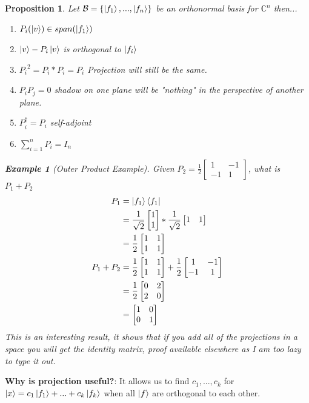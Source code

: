 \documentclass[12pt]{article}
\theoremstyle{plain}
\newtheorem{proposition}[lemma]{Proposition}
\theoremstyle{nonumberplain}
\theoremstyle{plain}
\newtheorem{example}[lemma]{Example}
\theoremstyle{nonumberplain}
\newcommand\1{{\bf 1}}
\newcommand{\bmat}[1]{\begin{bmatrix*} #1 \end{bmatrix*}} %
\newcommand{\C}{\mathbb{C}} %
\newcommand{\<}{\left\langle}
\renewcommand{\>}{\right\rangle}
\begin{document}
\begin{proposition}
Let $\mathcal{B} = \{\ket{f_1}, ... , \ket{f_n}\}$ be an orthonormal basis for $\C^n$ then...\\
\begin{enumerate}
\item $P_i(\ket{v}) \in span(\ket{f_1}) $
\item $\ket{v} - P_i\ket{v}$ is orthogonal to $\ket{f_i}$
\item ${P_i}^2 = P_i * P_i = P_i$ Projection will still be the same.
\item $P_iP_j = 0$ shadow on one plane will be "nothing" in the perspective of another plane.
\item $P_i^\dagger = P_i$ self-adjoint
\item $\sum_{i=1}^{n} P_i = I_n$
\end{enumerate}
\begin{example} [Outer Product Example]
Given $P_2 = \frac{1}{2} \bmat{1 &-1\\ -1& 1}$, what is $P_1 + P_2$\\
\begin{equation*} \renewcommand{\blacklozenge}{}
\begin{split}
P_1 &= \ket{f_1}\bra{f_1}\\
&= \frac{1}{\sqrt{2}} \bmat{1\\1} * \frac{1}{\sqrt{2}}\bmat{1&1}\\
&= \frac{1}{2} \bmat{1&1\\1&1}\\
P_1 + P_2 &= \frac{1}{2} \bmat{1&1\\1&1} + \frac{1}{2} \bmat{1&-1\\-1&1}\\
&= \frac{1}{2} \bmat{0&2\\2&0}\\
&= \bmat{1&0\\0&1}\\
\end{split}
\end{equation*}
This is an interesting result, it shows that if you add all of the projections in a space you will get the identity matrix, proof available elsewhere as I am too lazy to type it out.
\end{example}
\end{proposition}

\textbf{Why is projection useful?}: It allows us to find $c_1, ... , c_k$ for $\ket{x} = c_1\ket{f_1} + ... + c_k\ket{f_k}$  when all $\ket{f}$ are orthogonal to each other.
\end{document}
